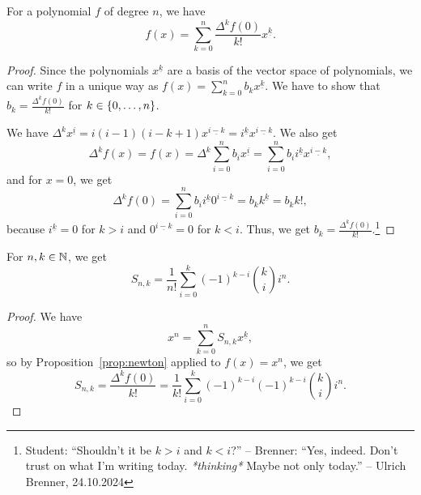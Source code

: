 \documentclass[language=english]{../../Template/TemplateLecture}
\begin{document}
\begin{prop}\label{prop:newton}
    For a polynomial $f$ of degree $n$, we have
    \begin{equation}
        f(x) = \sum_{k = 0}^n \frac{\Delta^k f(0)}{k!} x^{\underline{k}}.
    \end{equation}
\end{prop}

\begin{proof}
    Since the polynomials $x^{\underline{k}}$ are a basis of the vector space of polynomials, we can write $f$ in a unique way as $f(x) = \sum_{k = 0}^n b_k x^{\underline{k}}$. We have to show that $b_k = \frac{\Delta^k f(0)}{k!}$ for $k \in \{0,\ldots,n\}$.

    We have $\Delta^k x^{\underline{i}} = i(i-1)(i-k+1) x^{\underline{i-k}} = i^{\underline{k}}x^{\underline{i-k}}$. We also get 
    \begin{equation}
        \Delta^k f(x) = f(x) = \Delta^k \sum_{i = 0}^n b_i x^{\underline{i}} = \sum_{i = 0}^n b_i i^{\underline{k}} x^{\underline{i - k}},
    \end{equation} 
    and for $x = 0$, we get 
    \begin{equation}
        \Delta^k f(0) = \sum_{i = 0}^n b_i i^{\underline{k}} 0^{\underline{i-k}} = b_k k^{\underline{k}} = b_k k!,
    \end{equation}
    because $i^{\underline{k}} = 0$ for $k > i$ and $0^{\underline{i - k}} = 0$ for $k < i$. Thus, we get $b_k = \frac{\Delta^k f(0)}{k!}$.\footnote{Student: \enquote{Shouldn't it be $k > i$ and $k < i$?} -- Brenner: \enquote{Yes, indeed. Don't trust on what I'm writing today. \emph{*thinking*} Maybe not only today.} -- Ulrich Brenner, 24.10.2024}
\end{proof}

\begin{corollary}
    For $n, k \in \mathbb{N}$, we get 
    \begin{equation}
        S_{n,k} = \frac{1}{n!} \sum_{i = 0}^k (-1)^{k-i} \binom{k}{i} i^n.  
    \end{equation}
\end{corollary}
\begin{proof}
    We have 
    \begin{equation}
        x^n = \sum_{k = 0}^n S_{n,k} x^{\underline{k}},
    \end{equation}
    so by Proposition~\ref{prop:newton} applied to $f(x) = x^n$, we get
    \begin{equation}
        S_{n,k} = \frac{\Delta^k f(0)}{k!} = \frac{1}{k!}\sum_{i = 0}^k (-1)^{k-i} (-1)^{k-i} \binom{k}{i} i^n.
    \end{equation}
\end{proof}
\end{document}

